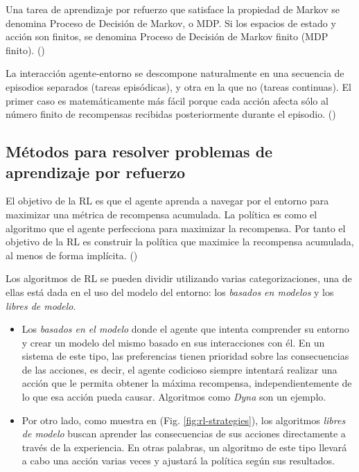 Una tarea de aprendizaje por refuerzo que satisface la propiedad de Markov se denomina Proceso de Decisión de Markov, o MDP. Si los espacios de estado y acción son finitos, se denomina Proceso de Decisión de Markov finito (MDP finito). (\cite{wiering2012reinforcement})

La interacción agente-entorno se descompone naturalmente en una secuencia de episodios separados (tareas episódicas), y otra en la que no (tareas continuas). El primer caso es matemáticamente más fácil porque cada acción afecta sólo al número finito de recompensas recibidas posteriormente durante el episodio. (\cite{wiering2012reinforcement})

\subsection{Métodos para resolver problemas de aprendizaje por refuerzo}

El objetivo de la RL es que el agente aprenda a navegar por el entorno para maximizar una métrica de recompensa acumulada. La política es como el algoritmo que el agente perfecciona para maximizar la recompensa. Por tanto el objetivo de la RL es construir la política que maximice la recompensa acumulada, al menos de forma implícita. (\cite{sutton1998introduction})

Los algoritmos de RL se pueden dividir utilizando varias categorizaciones, una de ellas está dada en el uso del modelo del entorno: los \textit{basados en modelos} y los \textit{libres de modelo}.

\begin{itemize}
\item Los \textit{basados en el modelo} donde el agente que intenta comprender su entorno y crear un modelo del mismo basado en sus interacciones con él. En un sistema de este tipo, las preferencias tienen prioridad sobre las consecuencias de las acciones, es decir, el agente codicioso siempre intentará realizar una acción que le permita obtener la máxima recompensa, independientemente de lo que esa acción pueda causar. Algoritmos como \textit{Dyna} son un ejemplo.

\item Por otro lado, como muestra en (Fig. \ref{fig:rl-strategies}), los algoritmos \textit{libres de modelo} buscan aprender las consecuencias de sus acciones directamente a través de la experiencia. En otras palabras, un algoritmo de este tipo llevará a cabo una acción varias veces y ajustará la política según sus resultados.
\end{itemize}

